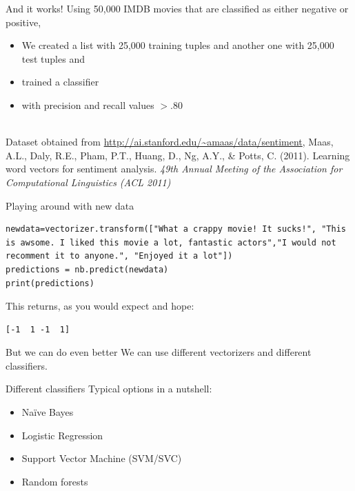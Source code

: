 \documentclass[compress]{beamer}
\begin{document}
\begin{frame}{And it works!}
	Using 50,000 IMDB movies that are classified as either negative or positive,
	\begin{itemize}
		\item We created a list with 25,000 training tuples and another one with 25,000 test tuples and
		\item trained a classifier
		\item with precision and recall values $>.80$
	\end{itemize}
	~\\
	\tiny{Dataset obtained from \url{http://ai.stanford.edu/~amaas/data/sentiment}, Maas, A.L., Daly, R.E., Pham, P.T., Huang, D., Ng, A.Y., \& Potts, C. (2011). Learning word vectors for sentiment analysis. \emph{49th Annual Meeting of the Association for Computational Linguistics (ACL 2011)}
	}
	
\end{frame}

\begin{frame}[fragile]{Playing around with new data}
\begin{lstlisting}
newdata=vectorizer.transform(["What a crappy movie! It sucks!", "This is awsome. I liked this movie a lot, fantastic actors","I would not recomment it to anyone.", "Enjoyed it a lot"])
predictions = nb.predict(newdata)
print(predictions)
\end{lstlisting}
This returns, as you would expect and hope:
\begin{lstlisting} 
[-1  1 -1  1]
\end{lstlisting}


\end{frame}




\begin{frame}{But we can do even better}
	We can use different vectorizers and different classifiers.
\end{frame}

\begin{frame}{Different classifiers}
	Typical options in a nutshell:
	\begin{itemize}
		\item Na\"ive Bayes
		\item Logistic Regression
		\item Support Vector Machine (SVM/SVC)
		\item Random forests
	\end{itemize}
\end{frame}
\end{document}
